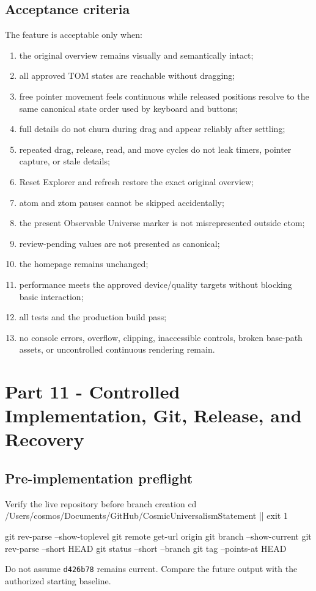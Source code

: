 \documentclass[11pt,letterpaper]{article}
\newcommand{\release}[1]{\texttt{#1}}
\begin{document}
\subsection{Acceptance criteria}
The feature is acceptable only when:
\begin{enumerate}
\item the original overview remains visually and semantically intact;
\item all approved TOM states are reachable without dragging;
\item free pointer movement feels continuous while released positions resolve to the same canonical state order used by keyboard and buttons;
\item full details do not churn during drag and appear reliably after settling;
\item repeated drag, release, read, and move cycles do not leak timers, pointer capture, or stale details;
\item Reset Explorer and refresh restore the exact original overview;
\item atom and ztom pauses cannot be skipped accidentally;
\item the present Observable Universe marker is not misrepresented outside ctom;
\item review-pending values are not presented as canonical;
\item the homepage remains unchanged;
\item performance meets the approved device/quality targets without blocking basic interaction;
\item all tests and the production build pass;
\item no console errors, overflow, clipping, inaccessible controls, broken base-path assets, or uncontrolled continuous rendering remain.
\end{enumerate}

\section{Part 11 - Controlled Implementation, Git, Release, and Recovery}
\subsection{Pre-implementation preflight}
\begin{commandbox}{Verify the live repository before branch creation}
cd /Users/cosmos/Documents/GitHub/CosmicUniversalismStatement || exit 1

git rev-parse --show-toplevel
git remote get-url origin
git branch --show-current
git rev-parse --short HEAD
git status --short --branch
git tag --points-at HEAD
\end{commandbox}
Do not assume \release{d426b78} remains current. Compare the future output with the authorized starting baseline.
\end{document}
